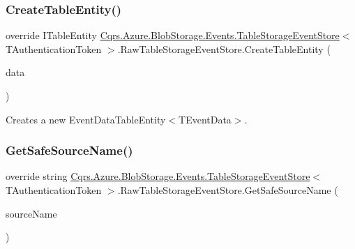 \subsubsection{\texorpdfstring{Create\+Table\+Entity()}{CreateTableEntity()}}
{\footnotesize\ttfamily override I\+Table\+Entity \hyperlink{classCqrs_1_1Azure_1_1BlobStorage_1_1Events_1_1TableStorageEventStore}{Cqrs.\+Azure.\+Blob\+Storage.\+Events.\+Table\+Storage\+Event\+Store}$<$ T\+Authentication\+Token $>$.Raw\+Table\+Storage\+Event\+Store.\+Create\+Table\+Entity (\begin{DoxyParamCaption}\item[{\hyperlink{classCqrs_1_1Events_1_1EventData}{Event\+Data}}]{data }\end{DoxyParamCaption})\hspace{0.3cm}{\ttfamily [protected]}}



Creates a new Event\+Data\+Table\+Entity$<$\+T\+Event\+Data$>$. 

\mbox{\label{classCqrs_1_1Azure_1_1BlobStorage_1_1Events_1_1TableStorageEventStore_1_1RawTableStorageEventStore_ab02dd26098d25c2663abdf3da9f57f0f_ab02dd26098d25c2663abdf3da9f57f0f}} 
\subsubsection{\texorpdfstring{Get\+Safe\+Source\+Name()}{GetSafeSourceName()}}
{\footnotesize\ttfamily override string \hyperlink{classCqrs_1_1Azure_1_1BlobStorage_1_1Events_1_1TableStorageEventStore}{Cqrs.\+Azure.\+Blob\+Storage.\+Events.\+Table\+Storage\+Event\+Store}$<$ T\+Authentication\+Token $>$.Raw\+Table\+Storage\+Event\+Store.\+Get\+Safe\+Source\+Name (\begin{DoxyParamCaption}\item[{string}]{source\+Name }\end{DoxyParamCaption})\hspace{0.3cm}{\ttfamily [protected]}}



